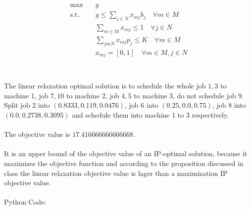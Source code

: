 \documentclass{article}
\begin{document}
\begin{equation}\label{eq:IP}\begin{split}
	\max \quad & y\\
	\mbox{s.t.} \quad 
	& y \leq \sum_{j \in N} x_{mj}b_j \quad \forall m \in M\\
	& \sum_{m \in M} x_{mj} \leq 1 \quad \forall j \in N\\
	& \sum_{j in N}x_{mj}p_j \leq K \quad \forall m \in M\\
	& x_{mj} = [0, 1] \quad \forall m \in M, j \in N\\
\end{split}\end{equation}
\\
\\The linear relaxation optimal solution is to schedule the whole job $1, 3$ to machine 1, job $7, 10$ to machine 2, job $4, 5$ to machine 3, do not schedule job 9. Split job 2 into $(0.8333, 0.119, 0.0476)$, job 6 into $(0.25, 0.0, 0.75)$, job 8 into $(0.0, 0.2738, 0.3095)$ and schedule them into machine 1 to 3 respectively.
\\
\\The objective value is $17.416666666666668$.
\\
\\It is an upper bound of the objective value of an IP-optimal solution, because it maximizes the objective function and according to the proposition discussed in class the linear relaxation objective value is lager than a maximization IP objective value.
\\
\\Python Code:
\end{document}
